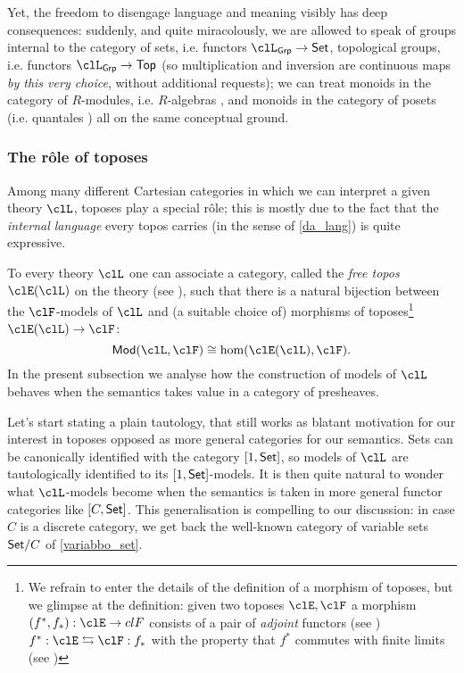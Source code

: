 Yet, the freedom to disengage language and meaning visibly has deep consequences: suddenly, and quite miracolously, we are allowed to speak of groups internal to the category of sets, i.e. functors $\clL_{\cate{Grp}} \to \Set$, topological groups, i.e. functors $\clL_{\cate{Grp}} \to \cate{Top}$ (so multiplication and inversion are continuous maps \emph{by this very choice}, without additional requests); we can treat monoids in the category of $R$-modules, i.e. $R$-algebras \cite[]{}, and monoids in the category of posets \cite{} (i.e. quantales \cite{}) all on the same conceptual ground.

\subsubsection{The r\^ole of toposes}
Among many different Cartesian categories in which we can interpret a given theory $\clL$, toposes play a special r\^ole; this is mostly due to the fact that the \emph{internal language} every topos carries (in the sense of \autoref{da_lang}) is quite expressive.

To every theory $\clL$ one can associate a category, called the \emph{free topos} $\clE(\clL)$ on the theory (see \cite{lambek1988introduction}), such that there is a natural bijection between the $\clF$-models of $\clL$ and (a suitable choice of) morphisms of toposes\footnote{We refrain to enter the details of the definition of a morphism of toposes, but we glimpse at the definition: given two toposes $\clE,\clF$ a morphism $(f^*,f_*) : \clE \to clF$ consists of a pair of \emph{adjoint} functors (see \cite[??]{Bor1}) $f^* : \clE \leftrightarrows \clF : f_*$ with the property that $f^*$ commutes with finite limits (see \cite[??]{Bor1})} $\clE(\clL) \to \clF$:
\[\cate{Mod}(\clL, \clF) \cong \hom(\clE(\clL), \clF).\]
In the present subsection we analyse how the construction of models of $\clL$ behaves when the semantics takes value in a category of presheaves.

Let's start stating a plain tautology, that still works as blatant motivation for our interest in toposes opposed as more general categories for our semantics. Sets can be canonically identified with the category $[1,\mathsf{Set}]$, so models of $\clL$ are tautologically identified to its $[1,\mathsf{Set}]$-models. It is then quite natural to wonder what $\clL$-models become when the semantics is taken in more general functor categories like $[C,\mathsf{Set}]$. This generalisation is compelling to our discussion: in case $C$ is a discrete category, we get back the well-known category of variable sets $\mathsf{Set}/C$ of \autoref{variabbo_set}.

